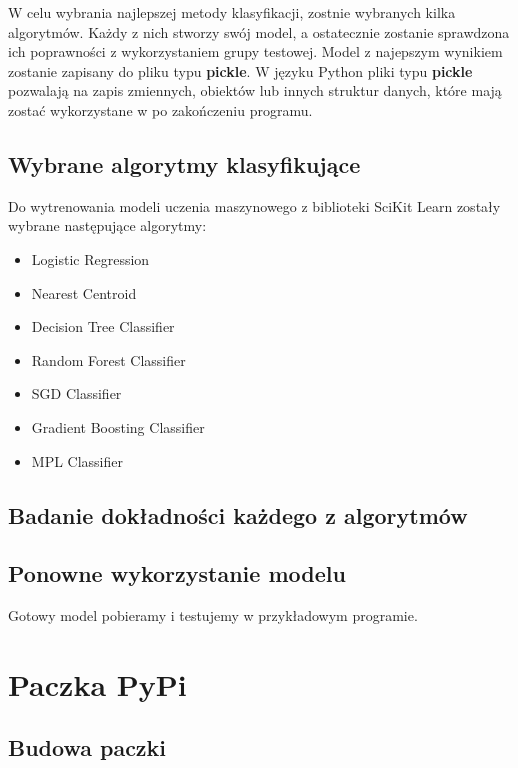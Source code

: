 \quad W celu wybrania najlepszej metody klasyfikacji, zostnie wybranych kilka algorytmów. Każdy z nich stworzy swój model, a ostatecznie zostanie sprawdzona ich poprawności z wykorzystaniem grupy testowej. Model z najepszym wynikiem zostanie zapisany do pliku typu \textbf{pickle}. W języku Python pliki typu \textbf{pickle} pozwalają na zapis zmiennych, obiektów lub innych struktur danych, które mają zostać wykorzystane w po zakończeniu programu. 

\subsection{Wybrane algorytmy klasyfikujące}

\quad Do wytrenowania modeli uczenia maszynowego z biblioteki SciKit Learn zostały wybrane następujące algorytmy:

\begin{itemize}
    \item Logistic Regression
    \item Nearest Centroid 
    \item Decision Tree Classifier 
    \item Random Forest Classifier 
    \item SGD Classifier
    \item Gradient Boosting Classifier
    \item MPL Classifier
\end{itemize}

\subsection{Badanie dokładności każdego z algorytmów}

\subsection{Ponowne wykorzystanie modelu}

\quad Gotowy model pobieramy i testujemy w przykładowym programie. 

\section{Paczka PyPi}

\subsection{Budowa paczki}

